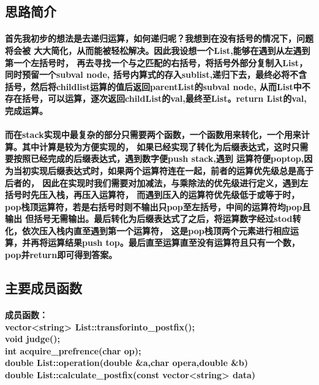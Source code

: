 \documentclass[UTF8]{ctexart}
\begin{document}
\subsection{思路简介}
\paragraph{\hspace{2em}
首先我初步的想法是去递归运算，如何递归呢？我想到在没有括号的情况下，问题将会被
大大简化，从而能被轻松解决。因此我设想一个List,能够在遇到从左遇到第一个左括号时，
再去寻找一个与之匹配的右括号，将括号外部分复制入List，同时预留一个subval node,
括号内算式的存入sublist,递归下去，最终必将不含括号，然后将childlist运算的值后返回parentList的subval node,
从而List中不存在括号，可以运算，逐次返回childList的val,最终至List。return List的val,完成运算。}
\paragraph{
\hspace{2em}而在stack实现中最复杂的部分只需要两个函数，一个函数用来转化，一个用来计算。其中计算是较为方便实现的，
如果已经实现了转化为后缀表达式，这时只需要按照已经完成的后缀表达式，遇到数字便push stack,遇到
运算符便poptop,因为当初实现后缀表达式时，如果两个运算符连在一起，前者的运算优先级总是高于后者的，
因此在实现时我们需要对加减法，与乘除法的优先级进行定义，遇到左括号时先压入栈，再压入运算符，
而遇到压入的运算符优先级低于或等于时，pop栈顶运算符，若是右括号时则不输出只pop至左括号，中间的运算符均pop且输出
但括号无需输出。最后转化为后缀表达式了之后，将运算数字经过stod转化，依次压入栈内直至遇到第一个运算符，
这是pop栈顶两个元素进行相应运算，并再将运算结果push top。最后直至运算直至没有运算符且只有一个数，
pop并return即可得到答案。
}
\subsection{主要成员函数}
\paragraph{
    \hspace{2em}成员函数：\\
    vector<string> List::transforinto\_postfix();\\
    void judge();\\
    int acquire\_prefrence(char op);\\
    double List::operation(double \&a,char opera,double \&b)\\
    double List::calculate\_postfix(const vector<string> data) \\
}
\end{document}
